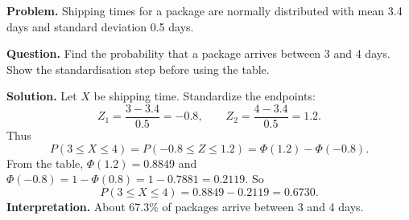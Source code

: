 \begin{ExamProblems}
		\textbf{Problem.}
		Shipping times for a package are normally distributed with mean 3.4 days and
		standard deviation 0.5 days.
		
		\textbf{Question.} Find the probability that a package arrives between 3 and 4 days.
		Show the standardisation step before using the table.
		
		\textbf{Solution.}
		Let \(X\) be shipping time. Standardize the endpoints:
		\[
		Z_1=\frac{3-3.4}{0.5}=-0.8,\qquad Z_2=\frac{4-3.4}{0.5}=1.2.
		\]
		Thus
		\[
		P(3\le X\le 4)=P(-0.8\le Z\le 1.2)=\Phi(1.2)-\Phi(-0.8).
		\]
		From the table, \(\Phi(1.2)=0.8849\) and \(\Phi(-0.8)=1-\Phi(0.8)=1-0.7881=0.2119\).
		So
		\[
		P(3\le X\le 4)=0.8849-0.2119=0.6730.
		\]
		\textbf{Interpretation.} About 67.3\% of packages arrive between 3 and 4 days.
		
	\end{ExamProblems}
	
	
